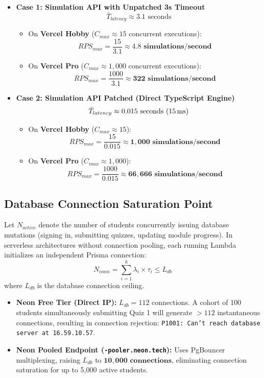 \documentclass[11pt, a4paper]{article}
\begin{document}
\begin{itemize}[leftmargin=1.5em]
    \item \textbf{Case 1: Simulation API with Unpatched 3s Timeout}
    $$\bar{T}_{latency} \approx 3.1\text{ seconds}$$
    \begin{itemize}
        \item On \textbf{Vercel Hobby} ($C_{max} \approx 15$ concurrent executions):
        $$RPS_{max} = \frac{15}{3.1} \approx \mathbf{4.8\text{ simulations/second}}$$
        \item On \textbf{Vercel Pro} ($C_{max} \approx 1,000$ concurrent executions):
        $$RPS_{max} = \frac{1000}{3.1} \approx \mathbf{322\text{ simulations/second}}$$
    \end{itemize}

    \item \textbf{Case 2: Simulation API Patched (Direct TypeScript Engine)}
    $$\bar{T}_{latency} \approx 0.015\text{ seconds (15\,ms)}$$
    \begin{itemize}
        \item On \textbf{Vercel Hobby} ($C_{max} \approx 15$):
        $$RPS_{max} = \frac{15}{0.015} \approx \mathbf{1,000\text{ simulations/second}}$$
        \item On \textbf{Vercel Pro} ($C_{max} \approx 1,000$):
        $$RPS_{max} = \frac{1000}{0.015} \approx \mathbf{66,666\text{ simulations/second}}$$
    \end{itemize}
\end{itemize}

\subsection{Database Connection Saturation Point}
Let $N_{active}$ denote the number of students concurrently issuing database mutations (signing in, submitting quizzes, updating module progress). In serverless architectures without connection pooling, each running Lambda initializes an independent Prisma connection:
\begin{equation}
    N_{conn} = \sum_{i=1}^{k} \lambda_i \times \tau_i \le L_{db}
\end{equation}
where $L_{db}$ is the database connection ceiling.
\begin{itemize}
    \item \textbf{Neon Free Tier (Direct IP):} $L_{db} = 112$ connections. A cohort of 100 students simultaneously submitting Quiz 1 will generate $>112$ instantaneous connections, resulting in connection rejection:
    \texttt{P1001: Can't reach database server at 16.59.10.57}.
    \item \textbf{Neon Pooled Endpoint (\texttt{-pooler.neon.tech}):} Uses PgBouncer multiplexing, raising $L_{db}$ to $\mathbf{10,000\text{ connections}}$, eliminating connection saturation for up to 5,000 active students.
\end{itemize}
\end{document}
